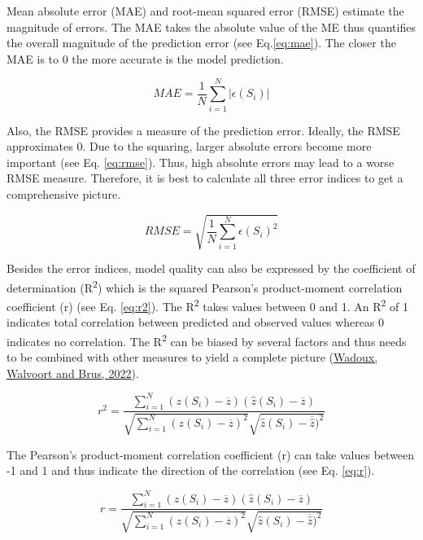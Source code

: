 \documentclass[
  10pt,
  b5paper,
  oneside]{book}
\begin{document}
Mean absolute error (MAE) and root-mean squared error (RMSE) estimate the magnitude of errors. The MAE takes the absolute value of the ME thus quantifies the overall magnitude of the prediction error (see Eq.\eqref{eq:mae}). The closer the MAE is to 0 the more accurate is the model prediction.

\begin{equation} 
  MAE = \frac{1}{N}\sum_{i=1}^{N}|\epsilon(S_{i})|
  \label{eq:mae}
\end{equation}

Also, the RMSE provides a measure of the prediction error. Ideally, the RMSE approximates 0. Due to the squaring, larger absolute errors become more important (see Eq. \eqref{eq:rmse}). Thus, high absolute errors may lead to a worse RMSE measure. Therefore, it is best to calculate all three error indices to get a comprehensive picture.

\begin{equation} 
  RMSE = \sqrt{\frac{1}{N}\sum_{i=1}^{N}\epsilon(S_{i})^{2}}
  \label{eq:rmse}
\end{equation}

Besides the error indices, model quality can also be expressed by the coefficient of determination (R\textsuperscript{2}) which is the squared Pearson's product-moment correlation coefficient (r) (see Eq. \eqref{eq:r2}). The R\textsuperscript{2} takes values between 0 and 1. An R\textsuperscript{2} of 1 indicates total correlation between predicted and observed values whereas 0 indicates no correlation. The R\textsuperscript{2} can be biased by several factors and thus needs to be combined with other measures to yield a complete picture (\protect\hyperlink{ref-Wadoux2022}{Wadoux, Walvoort and Brus, 2022}).

\begin{equation} 
  r^2 = \frac{\sum_{i=1}^{N}(z(S_{i})-\overline{z})(\hat{z}(S_{i})-\overline{z})}{\sqrt{\sum_{i=1}^{N}(z(S_{i})-\overline{z})^2}\sqrt{\hat{z}(S_{i})-\overline{\hat{z}})^2}}
  \label{eq:r2}
\end{equation}

The Pearson's product-moment correlation coefficient (r) can take values between -1 and 1 and thus indicate the direction of the correlation (see Eq. \eqref{eq:r}).

\begin{equation} 
  r = \frac{\sum_{i=1}^{N}(z(S_{i})-\overline{z})(\hat{z}(S_{i})-\overline{z})}{\sqrt{\sum_{i=1}^{N}(z(S_{i})-\overline{z})^2}\sqrt{\hat{z}(S_{i})-\overline{\hat{z}})^2}}
  \label{eq:r}
\end{equation}
\end{document}
